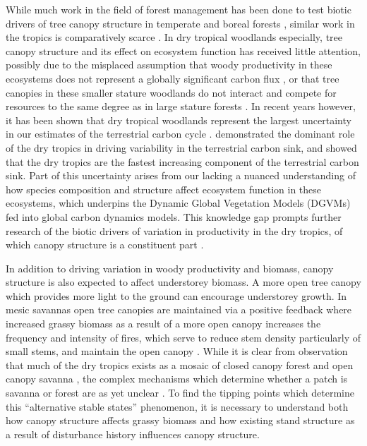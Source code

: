\documentclass[11pt,a4paper]{article}
\begin{document}
While much work in the field of forest management has been done to test biotic drivers of tree canopy structure in temperate \citep{} and boreal forests \citep{}, similar work in the tropics is comparatively scarce \citep{}. In dry tropical woodlands especially, tree canopy structure and its effect on ecosystem function has received little attention, possibly due to the misplaced assumption that woody productivity in these ecosystems does not represent a globally significant carbon flux \citep{}, or that tree canopies in these smaller stature woodlands do not interact and compete for resources to the same degree as in large stature forests \citep{}. In recent years however, it has been shown that dry tropical woodlands represent the largest uncertainty in our estimates of the terrestrial carbon cycle \citep{Quere2018, Ahlstrom2015}. \citet{Sitch2015} demonstrated the dominant role of the dry tropics in driving variability in the terrestrial carbon sink, and showed that the dry tropics are the fastest increasing component of the terrestrial carbon sink. Part of this uncertainty arises from our lacking a nuanced understanding of how species composition and structure affect ecosystem function in these ecosystems, which underpins the Dynamic Global Vegetation Models (DGVMs) fed into global carbon dynamics models. This knowledge gap prompts further research of the biotic drivers of variation in productivity in the dry tropics, of which canopy structure is a constituent part \citep{}.

In addition to driving variation in woody productivity and biomass, canopy structure is also expected to affect understorey biomass. A more open tree canopy which provides more light to the ground can encourage understorey growth. In mesic savannas open tree canopies are maintained via a positive feedback where increased grassy biomass as a result of a more open canopy increases the frequency and intensity of fires, which serve to reduce stem density particularly of small stems, and maintain the open canopy \citep{}. While it is clear from observation that much of the dry tropics exists as a mosaic of closed canopy forest and open canopy savanna \citep{}, the complex mechanisms which determine whether a patch is savanna or forest are as yet unclear \cite{}. To find the tipping points which determine this ``alternative stable states'' phenomenon, it is necessary to understand both how canopy structure affects grassy biomass and how existing stand structure as a result of disturbance history influences canopy structure. 
\end{document}
